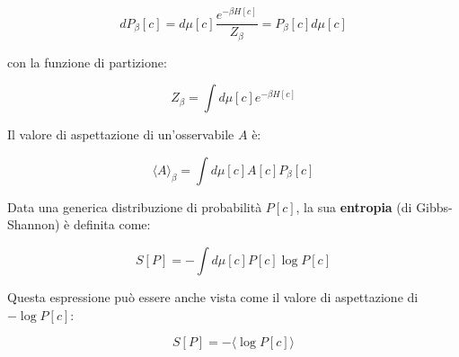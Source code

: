 \begin{equation}
    dP_{\beta}[c] = d\mu[c] \frac{e^{-\beta H[c]}}{Z_{\beta}} = P_{\beta}[c] d\mu[c]
\end{equation}


con la funzione di partizione:

\begin{equation}
    Z_{\beta} = \int d\mu[c] e^{-\beta H[c]}
\end{equation}


Il valore di aspettazione di un'osservabile $A$ è:

\begin{equation}
    \langle A \rangle_{\beta} = \int d\mu[c] A[c] P_{\beta}[c]
\end{equation}


Data una generica distribuzione di probabilità $P[c]$, la sua \textbf{entropia} (di Gibbs-Shannon) è definita come:

\begin{equation}
    S[P] = - \int d\mu[c] P[c] \log P[c]
\end{equation}


Questa espressione può essere anche vista come il valore di aspettazione di $-\log P[c]$: 

\begin{equation}
    S[P] = - \langle \log P[c] \rangle
\end{equation}

